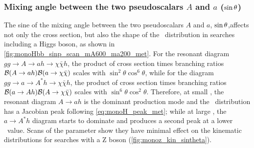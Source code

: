 \subsubsection{Mixing angle between the two pseudoscalars $A$ and $a$ ($\sin\theta$)}

The sine of the mixing angle between the two pseudoscalars $A$ and $a$, $\sin\theta$,affects not only the cross section, but also the shape of the \MET\ distribution in searches including a Higgs boson, as shown in \autoref{fig:monoHbb_sinp_scan_mA600_ma200_met}. 
For the resonant diagram $gg\rightarrow A \rightarrow ah \rightarrow \chi\bar{\chi}h$, the product of cross section times branching ratios  ${\cal B}(A\rightarrow ah){\cal B}(a \rightarrow \chi\bar{\chi})$ scales with $\sin^2\theta\cos^6\theta$, while for the diagram $gg\rightarrow a \rightarrow A^*h \rightarrow \chi\bar{\chi}h$, the product of cross section times branching ratios ${\cal B}(a\rightarrow Ah){\cal B}(A \rightarrow \chi\bar{\chi})$ scales with $\sin^6\theta\cos^2\theta$. 
Therefore, at small \sinp, the resonant diagram $A\rightarrow ah$ is the dominant production mode and the \MET\ distribution has a Jacobian peak following \autoref{eq:monoH_peak_met}; while at large \sinp, the $a\rightarrow A^*h$ diagram starts to dominate and produces a second peak at a lower \MET\ value.
Scans of the \sinp parameter show they have minimal effect on the kinematic distributions for searches with a Z boson (\autoref{fig:monoz_kin_sintheta}).  

